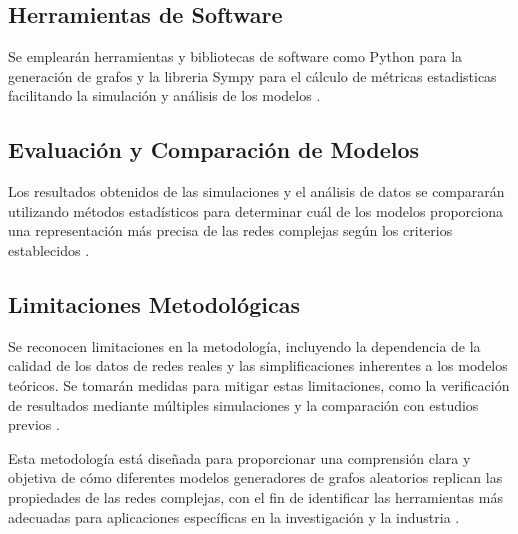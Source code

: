\subsection{Herramientas de Software}

Se emplearán herramientas y bibliotecas de software como Python para la generación de grafos y la libreria Sympy para el cálculo de métricas estadisticas facilitando la simulación y análisis de los modelos .

\subsection{Evaluación y Comparación de Modelos}

Los resultados obtenidos de las simulaciones y el análisis de datos se compararán utilizando métodos estadísticos para determinar cuál de los modelos proporciona una representación más precisa de las redes complejas según los criterios establecidos .

\subsection{Limitaciones Metodológicas}

Se reconocen limitaciones en la metodología, incluyendo la dependencia de la calidad de los datos de redes reales y las simplificaciones inherentes a los modelos teóricos. Se tomarán medidas para mitigar estas limitaciones, como la verificación de resultados mediante múltiples simulaciones y la comparación con estudios previos .

Esta metodología está diseñada para proporcionar una comprensión clara y objetiva de cómo diferentes modelos generadores de grafos aleatorios replican las propiedades de las redes complejas, con el fin de identificar las herramientas más adecuadas para aplicaciones específicas en la investigación y la industria .
